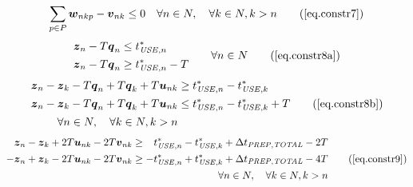 \begin{equation}
    \sum_{p \in P} \boldsymbol{w}_{nkp} - \boldsymbol{v}_{nk} \le 0 \quad
    \forall n \in N, \quad \forall k \in N, k > n
    \tag{\ref{eq.constr7}}
\end{equation}
\begin{equation}
    \begin{split}
        \begin{alignedat}{2}
            \boldsymbol{z}_{n} & {}-{} & T \boldsymbol{q}_{n} & \le
            t_{\mathit{USE},n}^{*}\\
            \boldsymbol{z}_{n} & {}-{} & T \boldsymbol{q}_{n} & \ge
            t_{\mathit{USE},n}^{*} - T
        \end{alignedat}
    \end{split}
    \quad\quad
    \begin{split}
        \forall n \in N
    \end{split}
    \tag{\ref{eq.constr8a}}
\end{equation}
\begin{equation}
    \begin{split}
        \boldsymbol{z}_{n} - \boldsymbol{z}_{k} - T \boldsymbol{q}_{n}
        + T \boldsymbol{q}_{k} + T \boldsymbol{u}_{nk} &\ge
        t_{\mathit{USE},n}^{*} - t_{\mathit{USE},k}^{*}\\
        \boldsymbol{z}_{n} - \boldsymbol{z}_{k} - T \boldsymbol{q}_{n}
        + T \boldsymbol{q}_{k} + T \boldsymbol{u}_{nk} &\le
        t_{\mathit{USE},n}^{*} - t_{\mathit{USE},k}^{*} + T\\
        \forall n \in N, \quad \forall k \in N, k > n
    \end{split}
    \tag{\ref{eq.constr8b}}
\end{equation}
\begin{equation}
    \begin{split}
        \begin{alignedat}{10}
            &\boldsymbol{z}_{n} {}-{} &\boldsymbol{z}_{k} {}+{} &2 T
            \boldsymbol{u}_{nk} {}-{} &2 T \boldsymbol{v}_{nk} &\ge
            &t_{\mathit{USE},n}^{*} {}-{} &t_{\mathit{USE},k}^{*} {}+{}
            &\Delta &t_{\mathit{PREP,TOTAL}} {}-{} 2 &T\\
            - &\boldsymbol{z}_{n} {}+{} &\boldsymbol{z}_{k} {}-{} &2 T
            \boldsymbol{u}_{nk} {}-{} &2 T \boldsymbol{v}_{nk} &\ge
            - &t_{\mathit{USE},n}^{*} {}+{} &t_{\mathit{USE},k}^{*} {}+{}
            &\Delta &t_{\mathit{PREP,TOTAL}} {}-{} 4 &T
        \end{alignedat}
        \\\forall n \in N, \quad \forall k \in N, k > n
    \end{split}
    \tag{\ref{eq.constr9}}
\end{equation}
